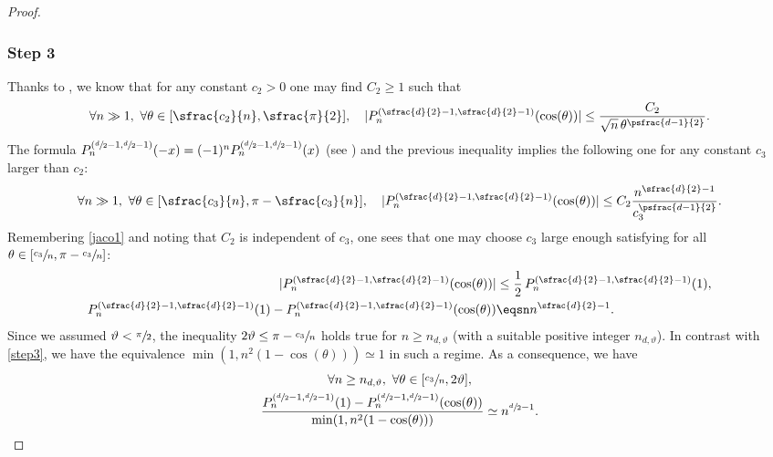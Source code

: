 \begin{proof}
\subsubsection*{Step 3} Thanks to \cite[Th.\,7.32.2, p.\,169]{szeg}, we know that for any constant $c_2>0$ one may find $C_2\geq 1$ such that
\begin{equation*}
\forall n\gg 1,\ \forall \theta \in[\sfrac{c_2}{n},\sfrac{\pi}{2}], \quad |P_n^{(\sfrac{d}{2}-1,\sfrac{d}{2}-1)} (\cos(\theta))|\leq \frac{C_2}{\sqrt{n}\, \theta^{\psfrac{d-1}{2}}}.
\end{equation*}
The formula
$P_n^{(\sfrac{d}{2}-1,\sfrac{d}{2}-1)}(-x)=(-1)^n P_n^{(\sfrac{d}{2}-1,\sfrac{d}{2}-1)}(x)$ (see \cite[p.\,59]{szeg}) and the previous inequality implies the following one for any constant $c_3$ larger than $c_2$:
\begin{equation*}
\forall n\gg 1,\ \forall \theta \in[\sfrac{c_3}{n},\pi-\sfrac{c_3}{n}], \quad |P_n^{(\sfrac{d}{2}-1,\sfrac{d}{2}-1)} (\cos(\theta))|\leq C_2\frac{n^{\sfrac{d}{2}-1}}{c_3^{\psfrac{d-1}{2}}}.
\end{equation*}
Remembering \eqref{jaco1} and noting that $C_2$ is independent of $c_3$, one sees that one may choose $c_3$ large enough satisfying for all $\theta\in \left[\sfrac{c_3}{n},\pi-\sfrac{c_3}{n}\right]$:
\begin{align}\nonumber
|P_n^{(\sfrac{d}{2}-1,\sfrac{d}{2}-1)} (\cos(\theta))|& \leq \frac{1}{2}\, P_n^{(\sfrac{d}{2}-1,\sfrac{d}{2}-1)} (1), \\ \label{jaco-cc3}
P_n^{(\sfrac{d}{2}-1,\sfrac{d}{2}-1)}(1)-P_n^{(\sfrac{d}{2}-1,\sfrac{d}{2}-1)}(\cos(\theta)) & \eqsn n^{\sfrac{d}{2}-1}.
\end{align}
Since we assumed $\vartheta<\sfrac{\pi}{2}$, the inequality $2\vartheta \leq \pi-\sfrac{c_3}{n}$ holds true for $n\geq n_{d,\vartheta}$ (with a suitable positive integer $n_{d,\vartheta}$).
In contrast with \eqref{step3}, we have the equivalence $\min(1,n^2(1-\cos(\theta))) \simeq 1$ in such a regime. As a consequence, we have
\begin{multline}\label{step4}
\forall n\geq n_{d,\vartheta},\ \forall \theta \in[\sfrac{c_3}{n},2\vartheta], \\ \frac{P_n^{(\sfrac{d}{2}-1,\sfrac{d}{2}-1)} (1)-P_n^{(\sfrac{d}{2}-1,\sfrac{d}{2}-1)} (\cos(\theta))}{\min(1,n^2(1-\cos(\theta)))}\simeq n^{\sfrac{d}{2}-1}.
\end{multline}


\end{proof}
